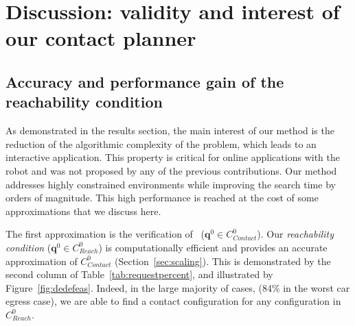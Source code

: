  \section{Discussion: validity and interest of our contact planner} 
\label{sec:discussion}

\subsection{Accuracy and performance gain of the reachability condition}

As demonstrated in the results section, the main interest of our method is the reduction of the algorithmic complexity of the problem, which leads to an interactive 
application. This property is critical for 
online applications with the robot and was not proposed by any of the previous contributions. Our method addresses highly constrained environments while improving the search time by orders of magnitude. This high performance is reached at the cost of some approximations that we discuss here. 

The first approximation is the verification of \contactreachability\ ($\mathbf{q}^0 \in C_{Contact}^0$).  Our \textit{reachability condition} ($\mathbf{q}^0 \in C_{Reach}^0$) is computationally efficient and provides an accurate approximation of $C_{Contact}^0$ (Section~\ref{sec:scaling}). This is demonstrated by the second column of Table~\ref{tab:requestpercent}, and illustrated by Figure~\ref{fig:dedefeas}. Indeed, in the large majority of cases, (84\% in the worst car egress case), we are able to find a contact configuration for any configuration in $C_{Reach}^0$.


